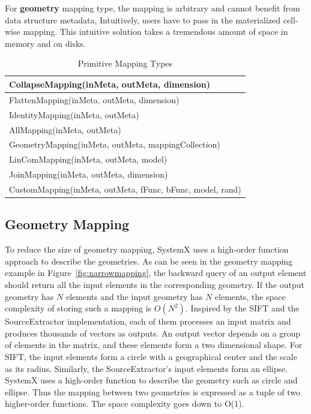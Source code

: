 \documentclass{sig-alternate}
\begin{document}
For {\bf geometry} mapping type, the mapping is arbitrary and cannot benefit from data structure metadata, 
Intuitively, users have to pass in the materialized cell-wise mapping. 
This intuitive solution takes a tremendous amount of space in memory and on disks.


\begin{table}[t]
\begin{center}
    \caption{Primitive Mapping Types}
    \begin{scriptsize}
    \begin{tabular}{ | p{8cm}|}
    \hline
    CollapseMapping(inMeta, outMeta, dimension) \\ \hline 
    FlattenMapping(inMeta, outMeta, dimension) \\ \hline
    IdentityMapping(inMeta, outMeta) \\ \hline
    AllMapping(inMeta, outMeta) \\ \hline
    GeometryMapping(inMeta, outMeta, mappingCollection) \\ \hline
    LinComMapping(inMeta, outMeta, model) \\ \hline
    JoinMapping(inMeta, outMeta, dimension) \\ \hline
    CustomMapping(inMeta, outMeta, fFunc, bFunc, model, rand) \\ \hline
    \end{tabular}
    \end{scriptsize}
    \label{tb:mapping-interface}
\end{center}   
\end{table}

\subsection{Geometry Mapping}
\label{sec:Design-GeometryMapping}
To reduce the size of geometry mapping, SystemX uses a high-order function approach to describe the geometries.
As can be seen in the geometry mapping example in Figure~\ref{fig:narrowmapping}, the backward query of an 
output element should return all the input elements in the corresponding geometry. If the output geometry has 
$N$ elements and the input geometry has $N$ elements, the space complexity of storing such a mapping is $O(N^2)$. 
Inspired by the SIFT and the SourceExtractor implementation, each of them processes an input matrix and produces 
thousands of vectors as outputs. An output vector depends on a group of elements in the matrix, and these elements 
form a two dimensional shape. 
For SIFT, the input elements form a circle with a geographical center and the scale as its radius.
Similarly, the SourceExtractor's input elements form an ellipse. 
SystemX uses a high-order function to describe the geometry such as circle and ellipse. 
Thus the mapping between two geometries is expressed as a tuple of two higher-order functions.
The space complexity goes down to O(1).
\end{document}
